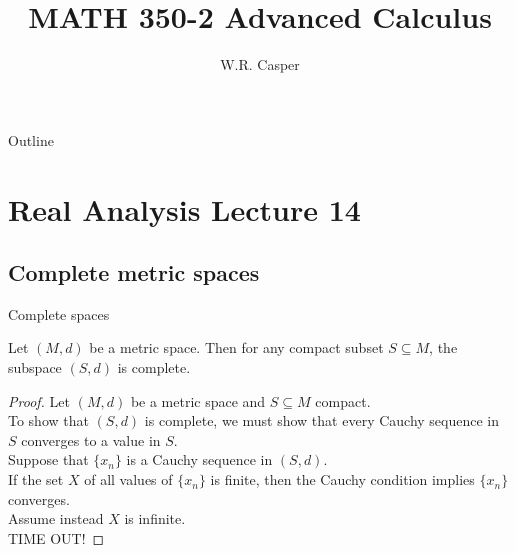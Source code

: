 \documentclass{beamer}
\title{MATH 350-2 Advanced Calculus}
\subtitle
{} %
\author[W.R. Casper] %
{W.R. Casper}
\institute[California State University Fullerton] %
{
  Department of Mathematics\\
  California State University Fullerton}
\begin{document}
\begin{frame}
  \titlepage
\end{frame}

\begin{frame}{Outline}
  \tableofcontents
\end{frame}



\section{Real Analysis Lecture 14}

\subsection{Complete metric spaces}

\begin{frame}{Complete spaces}
\begin{thm}
Let $(M,d)$ be a metric space.
\pause
Then for any compact subset $S\subseteq M$, the subspace $(S,d)$ is complete.
\end{thm}
\pause
\begin{proof}
\pause
Let $(M,d)$ be a metric space and $S\subseteq M$ compact.\\
\pause
To show that $(S,d)$ is complete, we must show that every Cauchy sequence in $S$ converges to a value in $S$.\\
\pause
Suppose that $\{x_n\}$ is a Cauchy sequence in $(S,d)$.\\
\pause
If the set $X$ of all values of $\{x_n\}$ is finite, then the Cauchy condition implies $\{x_n\}$ converges.\\
\pause
Assume instead $X$ is infinite.\\
\pause
TIME OUT!
\end{proof}
\end{frame}
\end{document}
